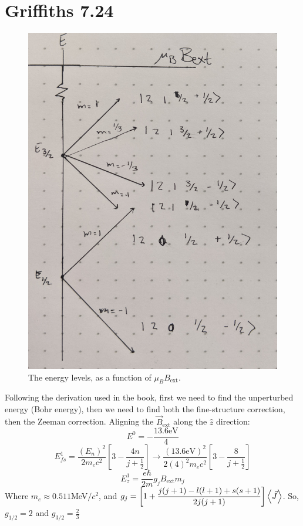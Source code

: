 \documentclass[11pt]{article}
\begin{document}
\section*{Griffiths 7.24}
\begin{figure}[!ht]
\centering
	\includegraphics[scale=0.075]{phsx462_hw04_01.jpg}
	\caption{The energy levels, as a function of $\mu_B B_\text{ext}$.}
	\label{fig:5.1}
\end{figure}

Following the derivation used in the book, first we need to find the unperturbed energy (Bohr energy), then we need to find both the fine-structure correction, then the Zeeman correction. Aligning the $\vec{B}_\text{ext}$ along the $\hat{z}$ direction:
\[E^0 = -\frac{13.6 \text{eV}}{4}\]
\[E_{fs}^1 = \frac{(E_n)^2}{2m_ec^2}\left[3 - \frac{4n}{j+\frac{1}{2}}\right] \rightarrow \frac{(13.6\text{eV})^2}{2(4)^2m_ec^2}\left[3-\frac{8}{j+\frac{1}{2}}\right]\]
\[E_z^1 = \frac{e\hbar}{2m}g_jB_\text{ext}m_j\]
Where $m_e \approx 0.511$MeV$/c^2$, and $g_j = \displaystyle{\left[1 + \frac{j(j+1)-l(l+1) + s(s+1)}{2j(j+1)}\right]\ev{\vec{J}}}$. So, $g_{1/2} = 2$ and $g_{3/2} = \frac{2}{3}$
\end{document}
